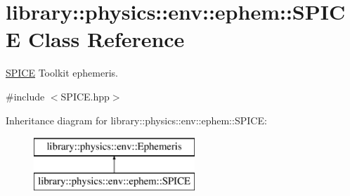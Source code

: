 \hypertarget{classlibrary_1_1physics_1_1env_1_1ephem_1_1_s_p_i_c_e}{}\section{library\+:\+:physics\+:\+:env\+:\+:ephem\+:\+:S\+P\+I\+CE Class Reference}
\label{classlibrary_1_1physics_1_1env_1_1ephem_1_1_s_p_i_c_e}


\hyperlink{classlibrary_1_1physics_1_1env_1_1ephem_1_1_s_p_i_c_e}{S\+P\+I\+CE} Toolkit ephemeris.  




{\ttfamily \#include $<$S\+P\+I\+C\+E.\+hpp$>$}

Inheritance diagram for library\+:\+:physics\+:\+:env\+:\+:ephem\+:\+:S\+P\+I\+CE\+:\begin{figure}[H]
\begin{center}
\leavevmode
\includegraphics[height=2.000000cm]{classlibrary_1_1physics_1_1env_1_1ephem_1_1_s_p_i_c_e}
\end{center}
\end{figure}
